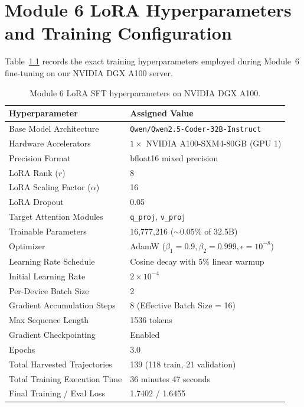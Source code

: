 \documentclass[12pt,a4paper]{report}
\begin{document}
\chapter{Module 6 LoRA Hyperparameters and Training Configuration}

Table~\ref{tab:lora_hyperparams} records the exact training hyperparameters employed during Module~6 fine-tuning on our NVIDIA DGX A100 server.

\begin{table}[htbp]
\centering
\caption{Module 6 LoRA SFT hyperparameters on NVIDIA DGX A100.}
\label{tab:lora_hyperparams}
\begin{tabular}{l l}
\toprule
\textbf{Hyperparameter} & \textbf{Assigned Value} \\
\midrule
Base Model Architecture & \texttt{Qwen/Qwen2.5-Coder-32B-Instruct} \\
Hardware Accelerators & $1\times$ NVIDIA A100-SXM4-80GB (GPU 1) \\
Precision Format & bfloat16 mixed precision \\
LoRA Rank ($r$) & 8 \\
LoRA Scaling Factor ($\alpha$) & 16 \\
LoRA Dropout & 0.05 \\
Target Attention Modules & \texttt{q\_proj}, \texttt{v\_proj} \\
Trainable Parameters & 16,777,216 ($\sim 0.05\%$ of 32.5B) \\
Optimizer & AdamW ($\beta_1 = 0.9, \beta_2 = 0.999, \epsilon = 10^{-8}$) \\
Learning Rate Schedule & Cosine decay with 5\% linear warmup \\
Initial Learning Rate & $2 \times 10^{-4}$ \\
Per-Device Batch Size & 2 \\
Gradient Accumulation Steps & 8 (Effective Batch Size = 16) \\
Max Sequence Length & 1536 tokens \\
Gradient Checkpointing & Enabled \\
Epochs & 3.0 \\
Total Harvested Trajectories & 139 (118 train, 21 validation) \\
Total Training Execution Time & 36 minutes 47 seconds \\
Final Training / Eval Loss & 1.7402 / 1.6455 \\
\bottomrule
\end{tabular}
\end{table}
\end{document}
